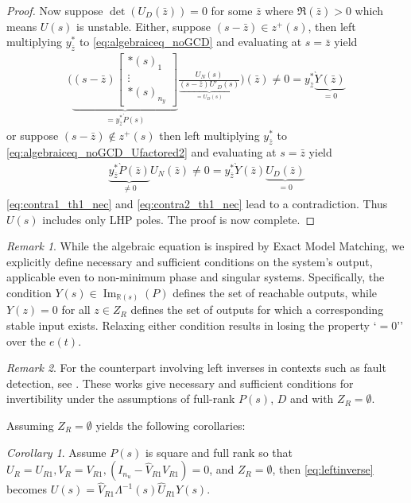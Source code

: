 \documentclass[journal]{IEEEtran}
\theoremstyle{remark}
\newtheorem{remark}{Remark}
\newtheorem{corollary}{Corollary}
\DeclareMathOperator*{\im}{Im}
\begin{document}
\begin{proof}
Now suppose $\det(U_D(\bar{z})) = 0$ for some $\bar{z}$ where $\Re(\bar{z})>0$ which means $U(s)$ is unstable. Either, suppose $(s-\bar{z}) \in z^+(s)$, then left multiplying $y^\ast_{\bar{z}}$ to \eqref{eq:algebraiceq_noGCD} and evaluating at $s=\bar{z}$ yield
\begin{align}\label{eq:contra1_th1_nec}
  \Biggl( \underbrace{(s-\bar{z})\begin{bmatrix}
\ast(s)_1 \\
\vdots \\
\ast(s)_{n_y}
\end{bmatrix}}_{= y^\ast_{\bar{z}}\grave{P}(s)}\frac{U_N(s)}{\underbrace{(s-\bar{z})U'_D(s)}_{=U_D(s)}} \Biggr) (\bar{z}) \ne 0 = y^\ast_{\bar{z}}\underbrace{\grave{Y}(\bar{z})}_{= 0}
\end{align}
or suppose $(s-\bar{z}) \notin z^+(s)$ then left multiplying $y^\ast_{\bar{z}}$ to \eqref{eq:algebraiceq_noGCD_Ufactored2} and evaluating at $s=\bar{z}$ yield
\begin{align} \label{eq:contra2_th1_nec}
  \underbrace{y^*_{\bar{z}} \grave{P}(\bar{z})}_{\ne 0}{U_N(\bar{z})} \ne 0 = {y^*_{\bar{z}}} \grave{Y}(\bar{z}) \underbrace{U_D(\bar{z})}_{= 0}
\end{align}
\eqref{eq:contra1_th1_nec} and \eqref{eq:contra2_th1_nec}
lead to a contradiction. Thus
$U(s)$ includes only LHP poles. 
The proof is now complete. 
\end{proof}
\begin{remark}
While the algebraic equation is inspired by Exact Model Matching, we explicitly define necessary and sufficient conditions on the system's output, applicable even to non-minimum phase and singular systems. {Specifically, the condition \(Y(s) \in \im_{\mathbb{R}(s)}(P)\) defines the set of reachable outputs, while \(Y(z) = 0\) for all \(z \in Z_R\) defines the set of outputs for which a corresponding stable input exists. Relaxing either condition results in losing the property `$=0$'' over the $e(t)$.}
\end{remark}
\begin{remark}
For the counterpart involving left inverses in contexts such as fault detection, see \cite{Loreto2023,estrada2007left}. These works give necessary and sufficient conditions for invertibility under the assumptions of full-rank $P(s)$, $D$ and with $Z_R=\emptyset$.   
\end{remark}
Assuming $Z_R = \emptyset$ yields the following corollaries:
\begin{corollary} \label{coro:min_phase_inverses}
Assume $P(s)$ is square and full rank so that $U_{R}=U_{R1},V_{R}=V_{R1}, (I_{n_u}-\hat{V}_{R1}{V}_{R1})=0$, and $ Z_R = \emptyset$, then \eqref{eq:leftinverse} becomes $U(s) ={\hat{V}_{R1}\Lambda^{-1}(s)\hat{U}_{R1}}Y(s)$.
\end{corollary}
\end{document}
